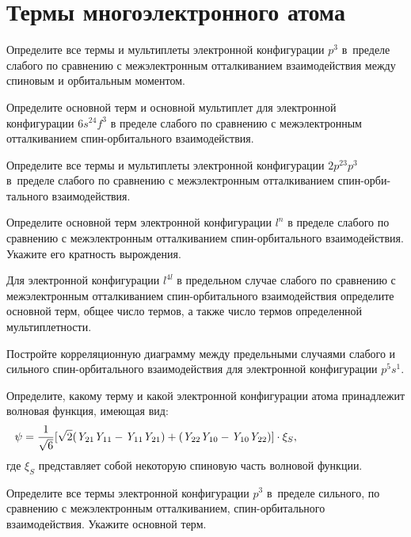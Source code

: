 \setmainfont{Noto Serif}
\setsansfont{Noto Sans}
\setmonofont{Noto Sans Mono}


\section{Термы многоэлектронного атома}

 Определите все термы и мультиплеты электронной конфигурации $p^3$ в~пределе слабого по сравнению с межэлектронным отталкиванием взаимодействия между спиновым и орбитальным моментом.
\par
{} Определите основной терм и основной мультиплет для электронной конфигурации $6s^24f^3$ в пределе слабого по сравнению с межэлектронным отталкиванием спин-орбитального взаимодействия.
\par
{} Определите все термы и мультиплеты электронной конфигурации $2p^23p^3$ в~пределе слабого по сравнению с межэлектронным отталкиванием спин-орби-тального взаимодействия.
\par
{} Определите основной терм электронной конфигурации $l^n$ в пределе слабого по сравнению с межэлектронным отталкиванием спин-орбитального взаимодействия. Укажите его кратность вырождения.
\par
{} Для электронной конфигурации $l^{4l}$ в предельном случае слабого по сравнению с межэлектронным отталкиванием спин-орбитального взаимодействия определите основной терм, общее число термов, а также число термов определенной мультиплетности.
\par
{} Постройте корреляционную диаграмму между предельными случаями слабого и сильного спин-орбитального взаимодействия для электронной конфигурации $p^5s^1$.
\par
{} Определите, какому терму и какой электронной конфигурации атома принадлежит волновая функция, имеющая вид:
\begin{equation*}
\begin{aligned}
\psi &=\frac{1}{\sqrt{6}}[\sqrt{2}(\textit{Y}_{21}\textit{Y}_{11}-\textit{Y}_{11}\textit{Y}_{21})+(\textit{Y}_{22}\textit{Y}_{10}-\textit{Y}_{10}\textit{Y}_{22})]\cdot\xi_S, \hspace{28mm}
\end{aligned}
\end{equation*}
где $\xi_S$ представляет собой некоторую спиновую часть волновой функции.
\par
{} Определите все термы электронной конфигурации $p^3$ в~пределе сильного, по сравнению с межэлектронным отталкиванием, спин-орбитального взаимодействия. Укажите основной терм.
